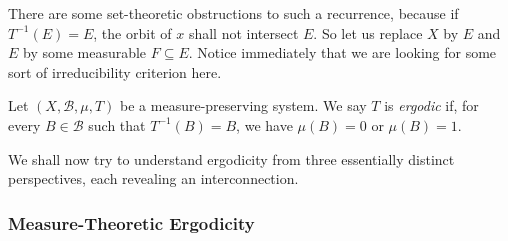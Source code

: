 \documentclass[11pt,a4paper]{article}
\begin{document}
There are some set-theoretic obstructions to such a recurrence, because if
$T^{-1}(E)=E$, the orbit of $x$ shall not intersect $E$. So let us replace
$X$ by $E$ and $E$ by some measurable $F\subseteq E$. Notice immediately that
we are looking for some sort of irreducibility criterion here.

\setcounter{definition}{4}\begin{definition}[Ergodicity]
Let $(X,\mathcal B,\mu,T)$ be a measure-preserving system. We say $T$ is
\emph{ergodic} if, for every $B\in\mathcal B$ such that $T^{-1}(B)=B$, we have
$\mu(B)=0$ or $\mu(B)=1$.
\end{definition}

We shall now try to understand ergodicity from three essentially distinct
perspectives, each revealing an interconnection.

\subsubsection{Measure-Theoretic Ergodicity}
\end{document}

